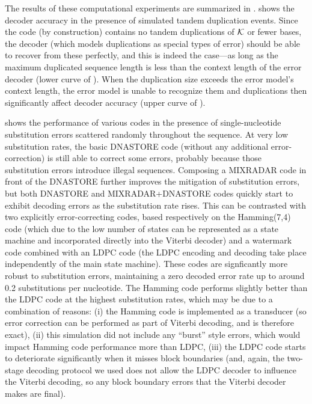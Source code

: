 \documentclass[english]{article}
\begin{document}
The results of these computational experiments are summarized in .
 shows the decoder accuracy in the presence of simulated tandem duplication events.
Since the code (by construction) contains no tandem duplications of ${\cal K}$ or fewer bases,
the decoder (which models duplications as special types of error)
should be able to recover from these perfectly, and this is indeed the case---as long
as the maximum duplicated sequence length is less than the context length of the error decoder
(lower curve of ).
When the duplication size exceeds the error model's context length,
the error model is unable to recognize them and duplications then significantly affect decoder accuracy
(upper curve of ).

 shows the performance of various codes in the presence of single-nucleotide substitution errors
scattered randomly throughout the sequence.
At very low substitution rates, the basic DNASTORE code (without any additional error-correction)
is still able to correct some errors, probably because those substitution errors introduce illegal sequences.
Composing a MIXRADAR code in front of the DNASTORE further improves the mitigation of substitution errors,
but both DNASTORE and MIXRADAR+DNASTORE codes quickly start to exhibit decoding errors as the substitution rate rises.
This can be contrasted with two explicitly error-correcting codes, based respectively on the Hamming(7,4) code
(which due to the low number of states can be represented as a state machine and incorporated directly into the
Viterbi decoder)
and a watermark code combined with an LDPC code
(the LDPC encoding and decoding take place independently of the main state machine).
These codes are signficantly more robust to substitution errors, maintaining a zero decoded error rate
up to around 0.2 substitutions per nucleotide.
The Hamming code performs slightly better than the LDPC code at the highest substitution rates,
which may be due to a combination of reasons:
(i) the Hamming code is implemented as a transducer (so error correction can be performed
as part of Viterbi decoding, and is therefore exact),
(ii) this simulation did not include any
``burst'' style errors, which would impact Hamming code performance more than LDPC,
(iii) the LDPC code starts to deteriorate significantly when it misses block boundaries
(and, again, the two-stage decoding protocol we used does not allow the LDPC decoder to influence the
Viterbi decoding, so any block boundary errors that the Viterbi decoder makes are final).
\end{document}
